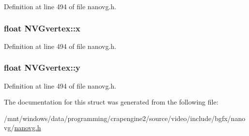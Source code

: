 Definition at line 494 of file nanovg.\+h.

\hypertarget{struct_n_v_gvertex_ac0c7b65243540638addff48cfed1b45b}{
\subsubsection[{x}]{\setlength{\rightskip}{0pt plus 5cm}float N\+V\+Gvertex\+::x}}\label{struct_n_v_gvertex_ac0c7b65243540638addff48cfed1b45b}


Definition at line 494 of file nanovg.\+h.

\hypertarget{struct_n_v_gvertex_a41db7ce4c246f4647ee2fb95005980f0}{
\subsubsection[{y}]{\setlength{\rightskip}{0pt plus 5cm}float N\+V\+Gvertex\+::y}}\label{struct_n_v_gvertex_a41db7ce4c246f4647ee2fb95005980f0}


Definition at line 494 of file nanovg.\+h.



The documentation for this struct was generated from the following file\+:\begin{DoxyCompactItemize}
\item 
/mnt/windows/data/programming/crapengine2/source/video/include/bgfx/nanovg/\hyperlink{nanovg_8h}{nanovg.\+h}\end{DoxyCompactItemize}
